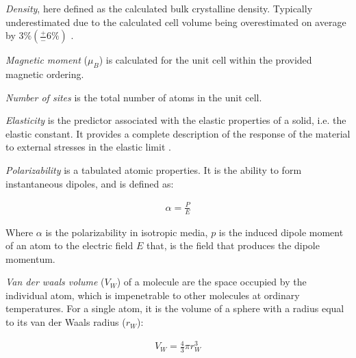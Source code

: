 	
	\textit{Density}, here defined as the calculated bulk crystalline density. Typically underestimated due to the calculated cell volume being overestimated on average by $3\% (\frac{+}{-} 6\%)$ \cite{jain2011high}.

	
\textit{Magnetic moment} ($\si{\mu_B}$) is calculated for the unit cell within the provided magnetic ordering. 
	
	\textit{Number of sites} is the total number of atoms in the unit cell. 
	
	\textit{Elasticity} is the predictor associated with the elastic properties of a solid, i.e. the elastic constant. It provides a complete description of the response of the material to external stresses in the elastic limit \cite{de2015charting}. 
	
	
	\textit{Polarizability} is a tabulated atomic properties. It is the ability to form instantaneous  dipoles, and is defined as: 
	
	\begin{align}
	\alpha = \frac{P}{E}
	\end{align}
	
	Where $\alpha $ is the polarizability in isotropic media, $p$ is the induced dipole moment of an atom to the electric field $E$ that, is the field that produces the dipole momentum. 
	
	\textit{Van der waals volume} ($V_W$) of a molecule are the space occupied by the individual atom, which is impenetrable to other molecules at ordinary temperatures. For a single atom, it is the volume of a sphere with a radius equal to its van der Waals radius ($r_W$):
	
	\begin{align}
	V_W = \frac{4}{3} \pi r^3_W
	\end{align}
	



	

